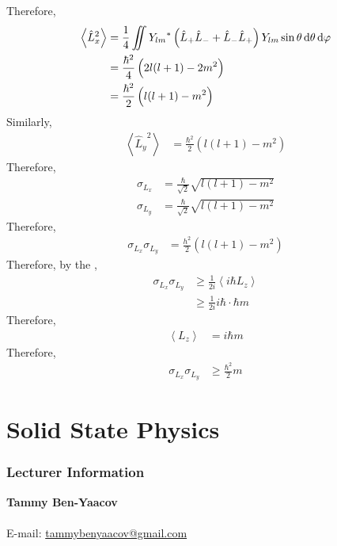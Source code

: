 \documentclass[titlepage, fleqn, a4paper, 12pt, twoside]{article}
\theoremstyle{definition}
\theoremstyle{theorem}
\let\Oldpart\part
\renewcommand{\part}{\FloatBarrier\Oldpart}
\let\Oldsection\section
\renewcommand{\section}{\FloatBarrier\Oldsection}
\begin{document}
Therefore,
\begin{align*}
	\left\langle {\hat{L}_x}^2 \right\rangle &= \frac{1}{4} \iint {Y_{l m}}^* \left( \hat{L}_+ \hat{L}_- + \hat{L}_- \hat{L}_+ \right) Y_{l m} \sin \theta \dif \theta \dif \varphi\\
	&= \frac{\hbar^2}{4} \left( 2 l (l + 1) - 2 m^2 \right)\\
	&= \frac{\hbar^2}{2} \left( l (l + 1) - m^2 \right)
\end{align*}
Similarly,
\begin{align*}
	\left\langle {\hat{L}_y}^2 \right\rangle &= \frac{\hbar^2}{2} \left( l (l + 1) - m^2 \right)
\end{align*}
Therefore,
\begin{align*}
	\sigma_{L_x} &= \frac{\hbar}{\sqrt{2}} \sqrt{l (l + 1) - m^2}\\
	\sigma_{L_y} &= \frac{\hbar}{\sqrt{2}} \sqrt{l (l + 1) - m^2}
\end{align*}
Therefore,
\begin{align*}
	\sigma_{L_x} \sigma_{L_y} &= \frac{h^2}{2} \left( l (l + 1) - m^2 \right)
\end{align*}
Therefore, by the ,
\begin{align*}
	\sigma_{L_x} \sigma_{L_y} &\ge \frac{1}{2 i} \left\langle i \hbar L_z \right\rangle\\
	&\ge \frac{1}{2 i} i \hbar \cdot \hbar m
\end{align*}
Therefore,
\begin{align*}
	\left\langle L_z \right\rangle &= i \hbar m
\end{align*}
Therefore,
\begin{align*}
	\sigma_{L_x} \sigma_{L_y} &\ge \frac{\hbar^2}{2} m
\end{align*}

\newpage
\part{Solid State Physics}

\section{Lecturer Information}

\textbf{Tammy Ben-Yaacov}\\
~\\
E-mail: \href{mailto:tammybenyaacov@gmail.com}{tammybenyaacov@gmail.com}\\
\end{document}
